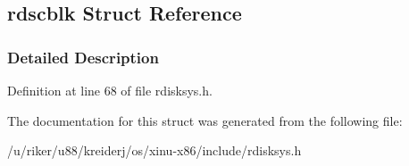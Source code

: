\hypertarget{structrdscblk}{}\subsection{rdscblk Struct Reference}
\label{structrdscblk}


\subsubsection{Detailed Description}


Definition at line 68 of file rdisksys.\+h.



The documentation for this struct was generated from the following file\+:\begin{DoxyCompactItemize}
\item 
/u/riker/u88/kreiderj/os/xinu-\/x86/include/rdisksys.\+h\end{DoxyCompactItemize}
